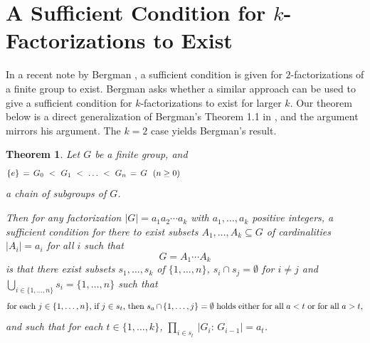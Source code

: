 \documentclass{amsart}
\newtheorem{theorem}{Theorem}[section]
\begin{document}
\section{A Sufficient Condition for $k$-Factorizations to Exist}

In a recent note by Bergman \cite{berg2}, a sufficient condition is given for $2$-factorizations of a finite group to exist.  Bergman asks whether a similar approach can be used to give a sufficient condition for $k$-factorizations to exist for larger $k$.  Our theorem below is a direct generalization of Bergman's Theorem 1.1 in \cite{berg2}, and the argument mirrors his argument.  The $k=2$ case yields Bergman's result.

\begin{theorem}\label{thm2}
Let $G$ be a finite group, and
%
\begin{equation}\begin{minipage}[c]{35pc}\label{d.G0Gn}
$\{e\}\,=\,G_0\ <\ G_1\ <\ \dots\ <\ G_n\,=\,G$ \ $(n\geq 0)$
\end{minipage}\end{equation}
%
a chain of subgroups of $G$.

Then for any factorization $|G| = a_1 a_2 \cdots a_k$ with $a_1, \dots, a_k$ positive integers, a {\em sufficient} condition for there
to exist subsets $A_1,\dots,A_k \subseteq G$ of cardinalities $|A_i| = a_i$ for all $i$ such that $$G = A_1 \cdots A_k$$
is that there exist subsets $s_1 , \dots, s_k$ of $\{1,\dots,n\}$, $s_i \cap s_j = \emptyset$ for $i \neq j$ and $\bigcup_{i \in \{1,\dots,n\}} s_i = \{1,\dots,n\}$ such that 
%
\begin{equation*}\begin{minipage}[c]{35pc}
for each $j \in \{1,\dots,n\}$, if $j \in s_t$, then $s_a \cap \{1,\dots,j\} = \emptyset$ holds either for all $a < t$ or for all $a > t$,
\end{minipage}\end{equation*}
%
and such that for each $t \in \{1,\dots,k\}$, $\prod_{i\in s_t}\,|G_i:\,G_{i-1}| = a_t$.
\end{theorem}
\end{document}
